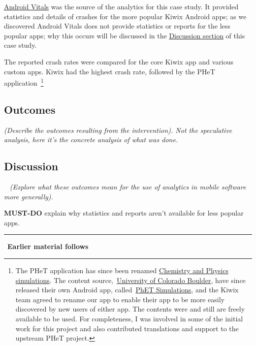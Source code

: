 \href{glossary_android_vitals}{Android Vitals} was the source of the analytics for this case study. It provided statistics and details of crashes for the more popular Kiwix Android apps; as we discovered Android Vitals does not provide statistics or reports for the less popular apps; why this occurs will be discussed in the \href{case-study-kiwix-discussion}{Discussion section} of this case study. 

The reported crash rates were compared for the core Kiwix app and various custom apps. Kiwix had the highest crash rate, followed by the PHeT application~\footnote{The PHeT application has since been renamed \href{https://play.google.com/store/apps/details?id=org.kiwix.kiwixcustomphet}{Chemistry and Physics simulations}. The content source,~\href{https://phet.colorado.edu/}{University of Colorado Boulder}, have since released their own Android app, called~\href{https://play.google.com/store/apps/details?id=edu.colorado.phet.androidApp}{PhET Simulations}, and the Kiwix team agreed to rename our app to enable their app to be more easily discovered by new users of either app. The contents were and still are freely available to be used. For completeness, I was involved in some of the initial work for this project and also contributed translations and support to the upstream PHeT project.} 



\subsection{Outcomes}
\textit{(Describe the outcomes resulting from the intervention). Not the speculative analysis, here it’s the concrete analysis of what was done.}

\subsection{Discussion}~\label{case-study-kiwix-discussion}
\textit{(Explore what these outcomes mean for the use of analytics in mobile software more generally).}

\textbf{MUST-DO} explain why statistics and reports aren't available for less popular apps.



\par\noindent\rule{\textwidth}{0.4pt}
~\textbf{Earlier material follows}


